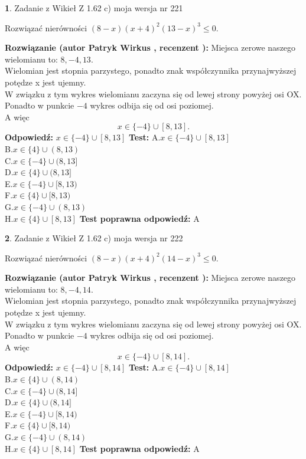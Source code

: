 \documentclass[12pt, a4paper]{article}
\theoremstyle{definition} %
\newtheorem{zad}{}
\newcommand{\zadStart}[1]{\begin{zad}#1\newline}
\newcommand{\zadStop}{\end{zad}}
\newcommand{\rozwStart}[2]{\noindent \textbf{Rozwiązanie (autor #1 , recenzent #2): }\newline}
\newcommand{\rozwStop}{\newline}
\newcommand{\odpStart}{\noindent \textbf{Odpowiedź:}\newline}
\newcommand{\odpStop}{\newline}
\newcommand{\testStart}{\noindent \textbf{Test:}\newline}
\newcommand{\testStop}{\newline}
\newcommand{\kluczStart}{\noindent \textbf{Test poprawna odpowiedź:}\newline}
\newcommand{\kluczStop}{\newline}
\begin{document}
\zadStart{Zadanie z Wikieł Z 1.62 c) moja wersja nr 221}

Rozwiązać nierówności $(8-x)(x+4)^{2}(13-x)^{3}\le0$.
\zadStop
\rozwStart{Patryk Wirkus}{}
Miejsca zerowe naszego wielomianu to: $8, -4, 13$.\\
Wielomian jest stopnia parzystego, ponadto znak współczynnika przy\linebreak najwyższej potędze x jest ujemny.\\ W związku z tym wykres wielomianu zaczyna się od lewej strony powyżej osi OX.\\
Ponadto w punkcie $-4$ wykres odbija się od osi poziomej.\\
A więc $$x \in \{-4\} \cup [8,13].$$
\rozwStop
\odpStart
$x \in \{-4\} \cup [8,13]$
\odpStop
\testStart
A.$x \in \{-4\} \cup [8,13]$\\
B.$x \in \{4\} \cup (8,13)$\\
C.$x \in \{-4\} \cup (8,13]$\\
D.$x \in \{4\} \cup (8,13]$\\
E.$x \in \{-4\} \cup [8,13)$\\
F.$x \in \{4\} \cup [8,13)$\\
G.$x \in \{-4\} \cup (8,13)$\\
H.$x \in \{4\} \cup [8,13]$
\testStop
\kluczStart
A
\kluczStop



\zadStart{Zadanie z Wikieł Z 1.62 c) moja wersja nr 222}

Rozwiązać nierówności $(8-x)(x+4)^{2}(14-x)^{3}\le0$.
\zadStop
\rozwStart{Patryk Wirkus}{}
Miejsca zerowe naszego wielomianu to: $8, -4, 14$.\\
Wielomian jest stopnia parzystego, ponadto znak współczynnika przy\linebreak najwyższej potędze x jest ujemny.\\ W związku z tym wykres wielomianu zaczyna się od lewej strony powyżej osi OX.\\
Ponadto w punkcie $-4$ wykres odbija się od osi poziomej.\\
A więc $$x \in \{-4\} \cup [8,14].$$
\rozwStop
\odpStart
$x \in \{-4\} \cup [8,14]$
\odpStop
\testStart
A.$x \in \{-4\} \cup [8,14]$\\
B.$x \in \{4\} \cup (8,14)$\\
C.$x \in \{-4\} \cup (8,14]$\\
D.$x \in \{4\} \cup (8,14]$\\
E.$x \in \{-4\} \cup [8,14)$\\
F.$x \in \{4\} \cup [8,14)$\\
G.$x \in \{-4\} \cup (8,14)$\\
H.$x \in \{4\} \cup [8,14]$
\testStop
\kluczStart
A
\kluczStop
\end{document}
